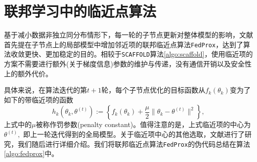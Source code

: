 \section{联邦学习中的临近点算法}
\label{sec:chap2-ppa}

基于减小数据非独立同分布情形下，每一轮的子节点更新对整体模型的影响，文献\parencite{sahu2018fedprox}首先提在子节点上的局部模型中增加邻近项的联邦临近点算法\texttt{FedProx}，达到了算法收敛更快、更加稳定的目的。相较于\texttt{SCAFFOLD}算法\ref{algo:scaffold}，使用临近项的方案不需要进行额外(关于梯度信息)参数的维护与传递，没有通信开销以及安全性上的额外代价。

具体来说，在算法迭代的第$t+1$轮，每个子节点优化的目标函数从$f_k(\theta_k)$变为了如下的带临近项的函数
\begin{equation}
\label{eq:fedprox}
h_k(\theta_k, \theta^{(t)}) := \left\{ f_k(\theta_k) + \frac{\mu}{2} \lVert \theta_k - \theta^{(t)} \rVert^2  \right\},
\end{equation}
上式中的$\mu$被称作罚参数(penalty constant)。值得注意的是，上式临近项的中心为$\theta^{(t)},$ 即上一轮迭代得到的全局模型。关于临近项中心的其他选取，文献\parencite{hanzely2020federated,li_2021_ditto}进行了研究，我们随后进行详细介绍。我们将联邦临近点算法\texttt{FedProx}的伪代码总结在算法\ref{algo:fedprox}中。



